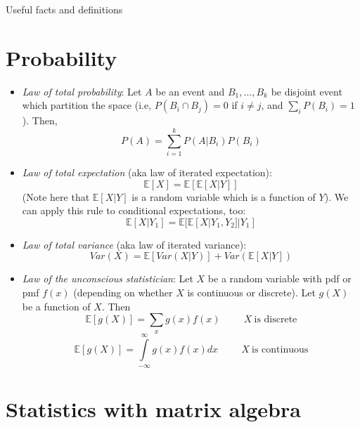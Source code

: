 \documentclass[11pt]{article}
\begin{document}
\begin{center}
\Large
Useful facts and definitions\\
\normalsize
\vspace{5mm}
\end{center}

\section*{Probability}

\begin{itemize}
\item \textit{Law of total probability}: Let $A$ be an event and $B_1,...,B_k$ be disjoint event which partition the space (i.e, $P(B_i \cap B_j) = 0$ if $i \neq j$, and $\sum_i P(B_i) = 1$). Then,
$$P(A) = \sum \limits_{i=1}^k P(A | B_i) P(B_i)$$

\item \textit{Law of total expectation} (aka law of iterated expectation):
$$\mathbb{E}[X] = \mathbb{E}[\mathbb{E}[X|Y]]$$
(Note here that $\mathbb{E}[X|Y]$ is a random variable which is a function of $Y$). We can apply this rule to conditional expectations, too:
$$\mathbb{E}[X | Y_1] = \mathbb{E}[\mathbb{E}[X | Y_1, Y_2] | Y_1]$$

\item \textit{Law of total variance} (aka law of iterated variance):
$$Var(X) = \mathbb{E}[Var(X|Y)] + Var(\mathbb{E}[X|Y])$$

\item \textit{Law of the unconscious statistician}: Let $X$ be a random variable with pdf or pmf $f(x)$ (depending on whether $X$ is continuous or discrete). Let $g(X)$ be a function of $X$. Then
$$\mathbb{E}[g(X)] = \sum_x g(x) f(x) \hspace{1cm} X \ \text{is discrete}$$
$$\mathbb{E}[g(X)] = \int \limits_{-\infty}^{\infty} g(x) f(x) dx \hspace{1cm} X \ \text{is continuous}$$

\end{itemize}

\section*{Statistics with matrix algebra}
\end{document}
